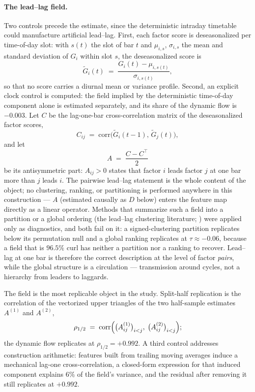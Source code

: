 \paragraph{The lead--lag field.}
Two controls precede the estimate, since the deterministic intraday timetable
could manufacture artificial lead--lag. First, each factor score is
deseasonalized per time-of-day slot: with $s(t)$ the slot of bar $t$ and
$\mu_{i,s}$, $\sigma_{i,s}$ the mean and standard deviation of $G_i$ within
slot $s$, the deseasonalized score is
\[
\tilde G_i(t) \;=\; \frac{G_i(t) - \mu_{i, s(t)}}{\sigma_{i, s(t)}},
\]
so that no score carries a diurnal mean or variance profile. Second, an
explicit clock control is computed: the field implied by the deterministic
time-of-day component alone is estimated separately, and its share of the
dynamic flow is $-0.003$. Let $C$ be the lag-one-bar cross-correlation matrix
of the deseasonalized factor scores,
\[
C_{ij} \;=\; \mathrm{corr}\bigl( \tilde G_i(t-1),\, \tilde G_j(t) \bigr),
\]
and let
\[
A \;=\; \frac{C - C^{\top}}{2}
\]
be its antisymmetric part: $A_{ij} > 0$ states that factor $i$ leads factor
$j$ at one bar more than $j$ leads $i$. The pairwise lead--lag statement
is the whole content of the object; no clustering, ranking, or
partitioning is performed anywhere in this construction --- $A$ (estimated
causally as $D$ below) enters the feature map directly as a linear
operator. Methods that summarize such a field into a partition or a global
ordering (the lead--lag clustering literature; ) were
applied only as diagnostics, and both fail on it: a signed-clustering
partition replicates below its permutation null and a global ranking
replicates at $\tau \approx -0.06$, because a field that is $96.5\%$ curl
has neither a partition nor a ranking to recover. Lead--lag at one bar is
therefore the correct description at the level of factor \emph{pairs},
while the global structure is a circulation --- transmission around
cycles, not a hierarchy from leaders to laggards.

The field is the most replicable object in the study. Split-half replication
is the correlation of the vectorized upper triangles of the two half-sample
estimates $A^{(1)}$ and $A^{(2)}$,
\[
\rho_{1/2} \;=\; \mathrm{corr}\Bigl(
\bigl( A^{(1)}_{ij} \bigr)_{i<j},\;
\bigl( A^{(2)}_{ij} \bigr)_{i<j}
\Bigr);
\]
the dynamic flow replicates at $\rho_{1/2} = +0.992$. A third control
addresses construction arithmetic: features built from trailing moving
averages induce a mechanical lag-one cross-correlation, a closed-form
expression for that induced component explains 6\% of the field's variance,
and the residual after removing it still replicates at $+0.992$.


